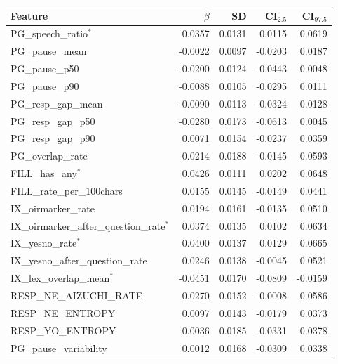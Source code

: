 \begin{tabular}{lrrrr}
\toprule
Feature & $\bar{\beta}$ & SD & CI$_{2.5}$ & CI$_{97.5}$ \\
\midrule
PG\_speech\_ratio$^{*}$ & 0.0357 & 0.0131 & 0.0115 & 0.0619 \\
PG\_pause\_mean & -0.0022 & 0.0097 & -0.0203 & 0.0187 \\
PG\_pause\_p50 & -0.0200 & 0.0124 & -0.0443 & 0.0048 \\
PG\_pause\_p90 & -0.0088 & 0.0105 & -0.0295 & 0.0111 \\
PG\_resp\_gap\_mean & -0.0090 & 0.0113 & -0.0324 & 0.0128 \\
PG\_resp\_gap\_p50 & -0.0280 & 0.0173 & -0.0613 & 0.0045 \\
PG\_resp\_gap\_p90 & 0.0071 & 0.0154 & -0.0237 & 0.0359 \\
PG\_overlap\_rate & 0.0214 & 0.0188 & -0.0145 & 0.0593 \\
FILL\_has\_any$^{*}$ & 0.0426 & 0.0111 & 0.0202 & 0.0648 \\
FILL\_rate\_per\_100chars & 0.0155 & 0.0145 & -0.0149 & 0.0441 \\
IX\_oirmarker\_rate & 0.0194 & 0.0161 & -0.0135 & 0.0510 \\
IX\_oirmarker\_after\_question\_rate$^{*}$ & 0.0374 & 0.0135 & 0.0102 & 0.0634 \\
IX\_yesno\_rate$^{*}$ & 0.0400 & 0.0137 & 0.0129 & 0.0665 \\
IX\_yesno\_after\_question\_rate & 0.0246 & 0.0138 & -0.0045 & 0.0521 \\
IX\_lex\_overlap\_mean$^{*}$ & -0.0451 & 0.0170 & -0.0809 & -0.0159 \\
RESP\_NE\_AIZUCHI\_RATE & 0.0270 & 0.0152 & -0.0008 & 0.0586 \\
RESP\_NE\_ENTROPY & 0.0097 & 0.0143 & -0.0179 & 0.0373 \\
RESP\_YO\_ENTROPY & 0.0036 & 0.0185 & -0.0331 & 0.0378 \\
PG\_pause\_variability & 0.0012 & 0.0168 & -0.0309 & 0.0338 \\
\bottomrule
\end{tabular}
